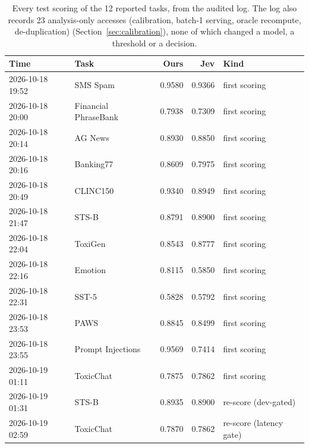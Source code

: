 \begin{table}[h]
\centering\small
\begin{tabular}{llrrl}
\toprule
Time & Task & Ours & Jev & Kind \\
\midrule
2026-10-18 19:52 & SMS Spam & 0.9580 & 0.9366 & first scoring \\
2026-10-18 20:00 & Financial PhraseBank & 0.7938 & 0.7309 & first scoring \\
2026-10-18 20:14 & AG News & 0.8930 & 0.8850 & first scoring \\
2026-10-18 20:16 & Banking77 & 0.8609 & 0.7975 & first scoring \\
2026-10-18 20:49 & CLINC150 & 0.9340 & 0.8949 & first scoring \\
2026-10-18 21:47 & STS-B & 0.8791 & 0.8900 & first scoring \\
2026-10-18 22:04 & ToxiGen & 0.8543 & 0.8777 & first scoring \\
2026-10-18 22:16 & Emotion & 0.8115 & 0.5850 & first scoring \\
2026-10-18 22:31 & SST-5 & 0.5828 & 0.5792 & first scoring \\
2026-10-18 23:53 & PAWS & 0.8845 & 0.8499 & first scoring \\
2026-10-18 23:55 & Prompt Injections & 0.9569 & 0.7414 & first scoring \\
2026-10-19 01:11 & ToxicChat & 0.7875 & 0.7862 & first scoring \\
2026-10-19 01:31 & STS-B & 0.8935 & 0.8900 & re-score (dev-gated) \\
2026-10-19 02:59 & ToxicChat & 0.7870 & 0.7862 & re-score (latency gate) \\
\bottomrule
\end{tabular}
\caption{Every test scoring of the 12 reported tasks, from the audited log. The log also records 23 analysis-only accesses (calibration, batch-1 serving, oracle recompute, de-duplication) (Section~\ref{sec:calibration}), none of which changed a model, a threshold or a decision.}
\label{tab:log}
\end{table}
